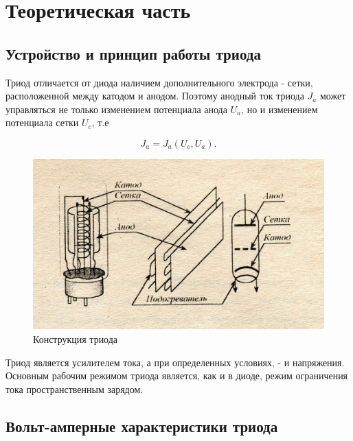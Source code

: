 



\def\labauthors{Карусевич А.А., Разова А.А.}
\def\labgroup{440}
\def\labnumber{2}
\def\labtheme{Исследование принципов статического управления электронным потоком в триоде}
\renewcommand{\vec}{\mathbf}
\renewcommand{\phi}{\varphi}
\renewcommand{\hat}{\widehat}



\section{Теоретическая часть}
\subsection{Устройство и принцип работы триода}
Триод отличается от диода наличием дополнительного электрода - сетки, расположенной между катодом и анодом. Поэтому анодный ток триода $J_a$ может управляться не только изменением потенциала анода $U_a$, но и изменением потенциала сетки $U_c$, т.е

\begin{equation}
	J_a=J_a (U_c,U_a).
\end{equation}

\begin{figure}[h!]
	\centering
	\includegraphics[width=0.8\linewidth]{fig/img3.jpg}
	\caption{Конструкция триода}
	\label{fig:1}
\end{figure}
Триод является усилителем тока, а при определенных условиях, - и напряжения. Основным рабочим режимом триода является, как и в диоде, режим ограничения тока пространственным зарядом. 

\subsection{Вольт-амперные характеристики триода}

